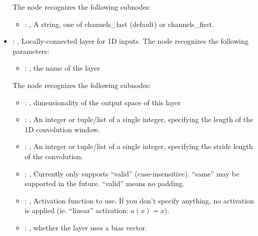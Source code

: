\begin{itemize}
      The  node recognizes the following subnodes:
      \begin{itemize}
        \item {}: , 
          A string, one of channels\_last (default) or channels\_first.
      \end{itemize}

    \item {}: , 
      Locally-connected layer for 1D inputs.
      The  node recognizes the following parameters:
        \begin{itemize}
          \item {}: , 
            the name of the layer
      \end{itemize}

      The  node recognizes the following subnodes:
      \begin{itemize}
        \item {}: , 
          dimensionality of the output space of this layer

        \item {}: , 
          An integer or tuple/list of a single integer, specifying the length of the 1D convolution
          window.

        \item {}: , 
          An integer or tuple/list of a single integer, specifying the stride length of the
          convolution.

        \item {}: , 
          Currently only supports ``valid'' (case-insensitive). ``same'' may be supported in the
          future.         ``valid'' means no padding.

        \item {}: , 
          Activation function to use. If you don't specify anything, no activation is applied (ie.
          ``linear''         activation: $a(x) = x)$.

        \item {}: , 
          whether the layer uses a bias vector.


\end{itemize}
\end{itemize}
